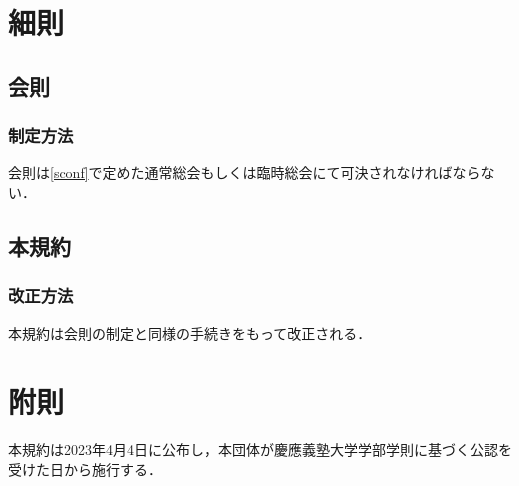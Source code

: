 \documentclass{ltjsarticle}
\begin{document}
  \section{細則}
    \subsection{会則}
      \subsubsection{制定方法}
        \jor
        会則は\ref{sconf}で定めた通常総会もしくは臨時総会にて可決されなければならない．
    \subsection{本規約}
      \subsubsection{改正方法}
        \jor
        本規約は会則の制定と同様の手続きをもって改正される．
  \section*{附則}
    本規約は2023年4月4日に公布し，本団体が慶應義塾大学学部学則に基づく公認を受けた日から施行する．
\end{document}
